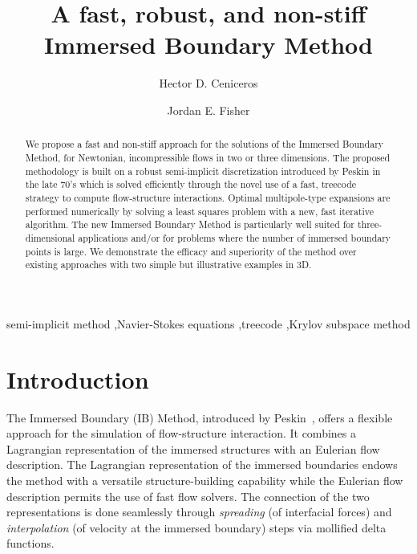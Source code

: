 \documentclass[preprint,12pt]{elsarticle}
\begin{document}
\begin{frontmatter}

\title{A fast, robust, and non-stiff Immersed Boundary Method}

\author{Hector D. Ceniceros}%
\address{Department of Mathematics, University of California Santa Barbara, CA 93106}
\author{Jordan E. Fisher}%
\address{Department of Mathematics, University of California Santa Barbara, CA 93106}
\begin{abstract}
We propose a fast  and non-stiff approach for the solutions of the Immersed Boundary Method, for Newtonian, incompressible flows 
in two or three dimensions.  The proposed methodology is built on a  robust  semi-implicit discretization introduced by Peskin in the late 70's which is solved 
 efficiently through the novel use of a fast,  treecode strategy to compute flow-structure interactions.  Optimal multipole-type expansions are performed numerically by solving a least squares problem with a new, fast iterative algorithm. The new Immersed Boundary Method is particularly well suited for three-dimensional applications and/or for problems where the number of immersed boundary points is large. We demonstrate the efficacy and superiority of the 
 method over existing approaches with two simple but illustrative examples in 3D. 

\end{abstract}

\begin{keyword}
semi-implicit method \sep Navier-Stokes equations \sep treecode \sep Krylov subspace method


\end{keyword}

\end{frontmatter}


\section{Introduction}
The Immersed Boundary (IB) Method, introduced by Peskin~\cite{Peskin77}, offers a flexible approach
 for the simulation of flow-structure interaction. It combines a Lagrangian representation of 
the immersed structures with  an Eulerian flow description.  The Lagrangian representation of the immersed boundaries 
endows the method with a versatile structure-building capability while the  Eulerian flow description permits  the use of fast flow solvers. The connection of the 
two representations is done seamlessly through 
{\em spreading} (of interfacial forces) and {\em interpolation} (of velocity at the immersed boundary) steps via mollified delta functions.  
  
\end{document}
